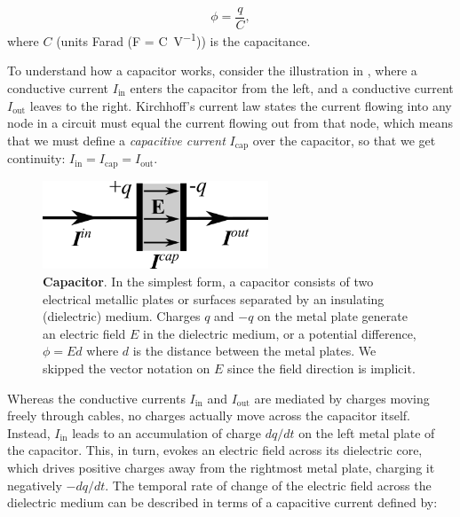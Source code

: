 \begin{equation}
\phi = \frac{q}{C}, 
\label{eq:Basics:Vcap}
\end{equation}
where $C$ (units Farad (\si{\farad} = \si{\coulomb\per\volt})) is the capacitance. 

To understand how a capacitor works, consider the illustration in , where a conductive current $I_\text{in}$ enters the capacitor from the left, and a conductive current $I_\text{out}$ leaves to the right. Kirchhoff's current law states the current flowing into any node in a circuit must equal the current flowing out from that node, which means that we must define
a \textit{capacitive current} $I_\text{cap}$ over the capacitor, so that we get continuity: $I_\text{in} = I_\text{cap} = I_\text{out}$. 

\begin{figure}[!ht]
\begin{center}
\includegraphics[width=0.6\textwidth]{Figures/Basics/Capacitor.png}
\end{center}
\caption{{\bf Capacitor}.  In the simplest form, a capacitor consists of two electrical metallic plates or surfaces separated by an insulating (dielectric) medium. Charges $q$ and $-q$ on the metal plate generate an electric field $E$ in the dielectric medium, or a potential difference, $\phi = Ed$ where $d$ is the distance between the metal plates. We skipped the vector notation on $E$ since the field direction is implicit.
}
\label{fig:Basics:Capacitor}
\end{figure}

Whereas the conductive currents $I_\text{in}$ and $I_\text{out}$ are mediated by charges moving freely through cables, no charges actually move across the capacitor itself. Instead, $I_\text{in}$ leads to an accumulation of charge $dq/dt$ on the left metal plate of the capacitor. This, in turn, evokes an electric field across its dielectric core, which drives positive charges away from the rightmost metal plate, charging it negatively $-dq/dt$. The temporal rate of change of the electric field across the dielectric medium can be described in terms of a capacitive current defined by:

